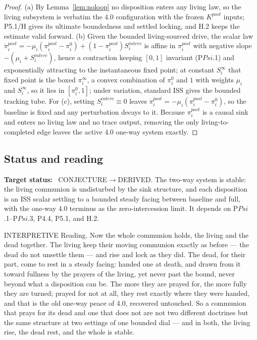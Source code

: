 \documentclass[11pt,a4paper]{article}
\def\Psi{Psi}%
\def\mathrm#1{#1}%
\def\emph#1{#1}%
\newcommand{\stDerived}{\textcolor{cDer}{\textsf{\small DERIVED}}}
\newcommand{\stInterp}{\textcolor{cInt}{\textsf{\small INTERPRETIVE}}}
\newcommand{\stConj}{\textcolor{cCon}{\textsf{\small CONJECTURE}}}
\theoremstyle{definition}
\theoremstyle{plain}
\theoremstyle{remark}
\begin{document}
\begin{proof}
(a) By Lemma~\ref{lem:noloop} no disposition enters any living law, so the living subsystem is
verbatim the 4.0 configuration with the frozen \(K^{\mathrm{post}}\) inputs; P5.1/H gives its
ultimate boundedness and settled locking, and H.2 keeps the estimate valid forward. (b) Given
the bounded living-sourced drive, the scalar law
\(\dot\pi_i^{\mathrm{post}}=-\mu_i(\pi_i^{\mathrm{post}}-\pi_i^{0})+(1-\pi_i^{\mathrm{post}})S_i^{\mathrm{interc}}\)
is affine in \(\pi_i^{\mathrm{post}}\) with negative slope \(-(\mu_i+S_i^{\mathrm{interc}})\),
hence a contraction keeping \([0,1]\) invariant (P$\Psi$.1) and exponentially attracting to the
instantaneous fixed point; at constant \(S_i^{\infty}\) that fixed point is the boxed
\(\pi_i^{\infty}\), a convex combination of \(\pi_i^{0}\) and \(1\) with weights \(\mu_i\) and
\(S_i^{\infty}\), so it lies in \([\pi_i^{0},1]\); under variation, standard ISS gives the
bounded tracking tube. For (c), setting \(S_i^{\mathrm{interc}}\equiv0\) leaves
\(\dot\pi_i^{\mathrm{post}}=-\mu_i(\pi_i^{\mathrm{post}}-\pi_i^0)\), so the baseline is
fixed and any perturbation decays to it. Because \(\pi_i^{\mathrm{post}}\) is a causal sink
and enters no living law and no trace output, removing the only living-to-completed edge leaves
the active 4.0 one-way system exactly. \qedhere
\end{proof}

\subsection{Status and reading}

\textbf{Target status:}~
\stConj\(\to\)\stDerived. The two-way system is stable: the living communion is undisturbed by
the sink structure, and each disposition is an ISS scalar settling to a bounded steady facing
between baseline and full, with the one-way 4.0 terminus as the zero-intercession limit. It
depends on P$\Psi$.1--P$\Psi$.3, P4.4, P5.1, and H.2.

\medskip
\stInterp\quad
\emph{Reading.}
Now the whole communion holds, the living and the dead together. The living keep their moving
communion exactly as before --- the dead do not unsettle them --- and rise and lock as they
did. The dead, for their part, come to rest in a steady facing: handed one at death, and drawn
from it toward fullness by the prayers of the living, yet never past the bound, never beyond
what a disposition can be. The more they are prayed for, the more fully they are turned; prayed
for not at all, they rest exactly where they were handed, and that is the old one-way peace of
4.0, recovered untouched. So a communion that prays for its dead and one that does not are not
two different doctrines but the same structure at two settings of one bounded dial --- and in
both, the living rise, the dead rest, and the whole is stable.
\end{document}
